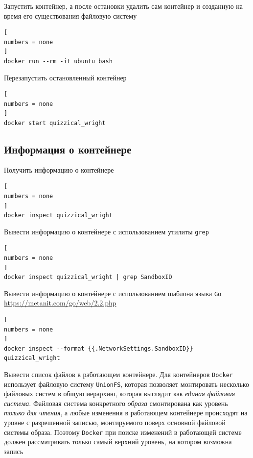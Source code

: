 \documentclass[%
	11pt,
	a4paper,
	utf8,
		]{article}
\begin{document}
Запустить контейнер, а после остановки удалить сам контейнер и созданную на время его существования файловую систему

\begin{lstlisting}[
numbers = none
]
docker run --rm -it ubuntu bash
\end{lstlisting}

Перезапустить остановленный контейнер

\begin{lstlisting}[
numbers = none
]
docker start quizzical_wright
\end{lstlisting}

\subsection{Информация о контейнере}

Получить информацию о контейнере

\begin{lstlisting}[
numbers = none
]
docker inspect quizzical_wright
\end{lstlisting}

Вывести информацию о контейнере с использованием утилиты \texttt{grep}

\begin{lstlisting}[
numbers = none
]
docker inspect quizzical_wright | grep SandboxID
\end{lstlisting}

Вывести информацию о контейнере с использованием шаблона языка \texttt{Go} \url{https://metanit.com/go/web/2.2.php}

\begin{lstlisting}[
numbers = none
]
docker inspect --format {{.NetworkSettings.SandboxID}} quizzical_wright
\end{lstlisting}

Вывести список файлов в работающем контейнере. Для контейнеров \texttt{Docker} использует файловую систему \texttt{UnionFS}, которая позволяет монтировать несколько файловых систем в общую иерархию, которая выглядит как \emph{единая файловая система}. Файловая система конкретного \emph{образа} смонтирована как уровень \emph{только для чтения}, а любые изменения в работающем контейнере происходят на уровне с разрешенной записью, монтируемого поверх основной {файловой системы образа}. Поэтому \texttt{Docker} при поиске изменений в работающей системе должен рассматривать только самый верхний уровень, на котором возможна запись \cite{mouat:docker-2017}
\end{document}
